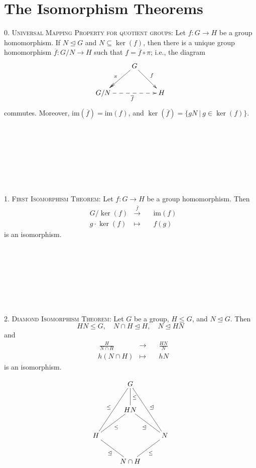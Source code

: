 \documentclass[12pt]{amsart}
\newcommand{\showsol}[1]{\def\displaysol{#1}}
\begin{document}
\showsol{0}
	
	\thispagestyle{empty}
	
	\section*{The Isomorphism Theorems}
	
	

\begin{framed}
\textsc{0. Universal Mapping Property for quotient groups:} Let $f:G\to H$ be a group homomorphism. If $N \trianglelefteq G$ and $N\subseteq \ker(f)$, then there is a unique group homomorphism $\overline{f}: G/N \to H$ such that $f= \overline{f} \circ \pi$; i.e., the diagram
$$\xymatrix{& G \ar@{->>}[ld]_\pi \ar[rd]^f  & \\
G/N \ar@{-->}[rr]_{\overline{f}}  && H \\}$$
commutes. Moreover, $\mathrm{im}(\overline{f}) = \mathrm{im}(f)$, and $\ker(\overline{f}) = \{ gN \ | \ g\in \ker(f)\}$.

\ 

 \
 
\noindent \hrulefill
 
 \
 
 \

\textsc{1. First Isomorphism Theorem:} Let $f:G\to H$ be a group homomorphism. Then 
\[\begin{aligned} &G/ \ker(f) &\xrightarrow{\overline{f}} & \quad \mathrm{im}(f)\\ 
& g \cdot \ker(f) &\mapsto &\quad f(g)\end{aligned}\] 
is an isomorphism.

\ 

 \
 
\noindent \hrulefill
 
 \
 
 \

\textsc{2. Diamond Isomorphism Theorem:} Let $G$ be a group, $H \leq G$, and $N \trianglelefteq G$. Then 
$$HN \leq G, \quad N \cap H \trianglelefteq H, \quad N \trianglelefteq HN$$ 
and 
\[\begin{aligned} & \ \frac{H}{N \cap H} &\longrightarrow & \quad \frac{HN}{N}\\ 
& h (N\cap H) &\mapsto &\quad hN \end{aligned}\] 
is an isomorphism.

\[
\xymatrix{
    &G\ar@{-}[d]^{\le}\ar@{-}[ddl]_{\le}\ar@{-}[ddr]^{\trianglelefteq}&\\
    &HN\ar@{-}[dl]^{\le}\ar@{-}[dr]_{\trianglelefteq}&\\
    H\ar@{-}[dr]_{\trianglelefteq}&&N\ar@{-}[dl]^{\le}\\
    &N \cap H&
    }\]


\end{framed}
\end{document}
